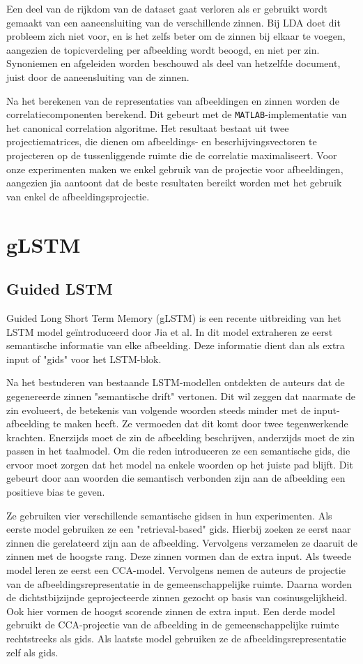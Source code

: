 Een deel van de rijkdom van de dataset gaat verloren als er gebruikt wordt gemaakt van een aaneensluiting van de verschillende zinnen. Bij LDA doet dit probleem zich niet voor, en is het zelfs beter om de zinnen bij elkaar te voegen, aangezien de topicverdeling per afbeelding wordt beoogd, en niet per zin. Synoniemen en afgeleiden worden beschouwd als deel van hetzelfde document, juist door de aaneensluiting van de zinnen.

Na het berekenen van de representaties van afbeeldingen en zinnen worden de correlatiecomponenten berekend. Dit gebeurt met de \texttt{MATLAB}-implementatie van het canonical correlation algoritme. Het resultaat bestaat uit twee projectiematrices, die dienen om afbeeldings- en bescrhijvingsvectoren te projecteren op de tussenliggende ruimte die de correlatie maximaliseert. Voor onze experimenten maken we enkel gebruik van de projectie voor afbeeldingen, aangezien jia  aantoont dat de beste resultaten bereikt worden met het gebruik van enkel de afbeeldingsprojectie.

\section{gLSTM}
\subsection{Guided LSTM}
Guided Long Short Term Memory (gLSTM) is een recente uitbreiding van het LSTM model ge\"introduceerd door Jia et al.  In dit model extraheren ze eerst semantische informatie van elke afbeelding. Deze informatie dient dan als extra input of "gids" voor het LSTM-blok.

Na het bestuderen van bestaande LSTM-modellen ontdekten de auteurs dat de gegenereerde zinnen "semantische drift" vertonen. Dit wil zeggen dat naarmate de zin evolueert, de betekenis van volgende woorden steeds minder met de input-afbeelding te maken heeft. Ze vermoeden dat dit komt door twee tegenwerkende krachten. Enerzijds moet de zin de afbeelding beschrijven, anderzijds moet de zin passen in het taalmodel. Om die reden introduceren ze een semantische gids, die ervoor moet zorgen dat het model na enkele woorden op het juiste pad blijft. Dit gebeurt door aan woorden die semantisch verbonden zijn aan de afbeelding een positieve bias te geven.

Ze gebruiken vier verschillende semantische gidsen in hun experimenten. Als eerste model gebruiken ze een "retrieval-based" gids. Hierbij zoeken ze eerst naar zinnen die gerelateerd zijn aan de afbeelding. Vervolgens verzamelen ze daaruit de zinnen met de hoogste rang. Deze zinnen vormen dan de extra input.
Als tweede model leren ze eerst een CCA-model. Vervolgens nemen de auteurs de projectie van de afbeeldingsrepresentatie in de gemeenschappelijke ruimte. Daarna worden de dichtstbijzijnde geprojecteerde zinnen gezocht op basis van cosinusgelijkheid. Ook hier vormen de hoogst scorende zinnen de extra input.
Een derde model gebruikt de CCA-projectie van de afbeelding in de gemeenschappelijke ruimte rechtstreeks als gids.
Als laatste model gebruiken ze de afbeeldingsrepresentatie zelf als gids.


